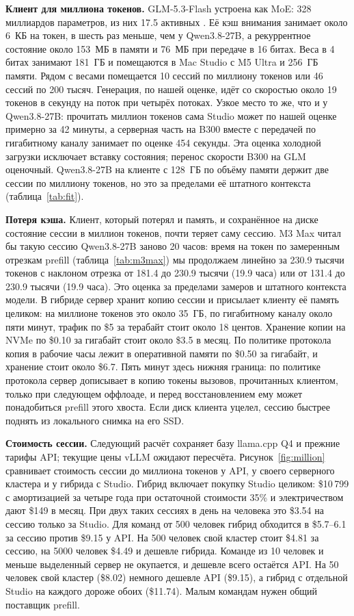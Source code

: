 \textbf{Клиент для миллиона токенов.} GLM-5.3-Flash устроена как MoE: 328 миллиардов параметров, из них 17.5 активных
\cite{glm53flash}. Её кэш внимания занимает около 6~КБ на токен, в шесть раз меньше, чем у Qwen3.8-27B, а рекуррентное состояние около 153~МБ в памяти и 76~МБ при передаче в 16 битах. Веса в 4 битах занимают 181~ГБ и помещаются в Mac Studio с M5 Ultra и 256~ГБ памяти. Рядом с весами
помещается 10 сессий по миллиону токенов или 46 сессий по 200 тысяч. Генерация, по нашей оценке, идёт со скоростью
около 19 токенов в секунду на поток при четырёх потоках. Узкое место то же, что и у Qwen3.8-27B: прочитать миллион токенов сама Studio может по нашей оценке примерно за 42 минуты, а серверная часть на B300 вместе с передачей по гигабитному каналу занимает по оценке 454 секунды.
Эта оценка холодной загрузки исключает вставку состояния; перенос скорости B300 на GLM оценочный. Qwen3.8-27B
на клиенте с 128~ГБ по объёму памяти держит две сессии по миллиону токенов, но это за пределами её штатного
контекста (таблица~\ref{tab:fit}).

\textbf{Потеря кэша.} Клиент, который потерял и память, и сохранённое на диске состояние сессии в миллион токенов,
почти теряет саму сессию. M3 Max читал бы такую сессию Qwen3.8-27B заново 20 часов: время на токен по замеренным
отрезкам prefill (таблица~\ref{tab:m3max}) мы продолжаем линейно за 230.9 тысячи токенов с наклоном отрезка от 181.4 до 230.9 тысячи (19.9 часа) или от 131.4 до 230.9 тысячи (19.9 часа). Это оценка за пределами замеров и штатного контекста
модели. В гибриде сервер хранит копию сессии и присылает клиенту её память целиком: на миллионе токенов это около 35~ГБ, по гигабитному каналу около пяти минут, трафик по \$5 за терабайт стоит около 18 центов. Хранение копии на NVMe по \$0.10 за гигабайт стоит около \$3.5 в месяц. По политике протокола копия в рабочие часы лежит в оперативной памяти по \$0.50 за гигабайт, и хранение стоит около \$6.7. Пять минут здесь нижняя граница: по политике протокола
сервер дописывает в копию токены вызовов, прочитанных клиентом, только при следующем оффлоаде, и перед
восстановлением ему может понадобиться prefill этого хвоста. Если диск клиента уцелел, сессию быстрее поднять из
локального снимка на его SSD.

\textbf{Стоимость сессии.} Следующий расчёт сохраняет базу llama.cpp Q4 и прежние тарифы API; текущие цены vLLM ожидают пересчёта. Рисунок~\ref{fig:million} сравнивает стоимость сессии до миллиона токенов у API, у своего
серверного кластера и у гибрида с Studio. Гибрид включает покупку Studio целиком: \$10\,799 с амортизацией за четыре
года при остаточной стоимости 35\% и электричеством дают \$149 в месяц. При двух таких сессиях в день на человека это \$3.54 на сессию только за Studio. Для команд от
500 человек гибрид обходится в \$5.7--6.1 за сессию против \$9.15 у API.
На 500 человек свой кластер стоит \$4.81 за сессию, на 5000 человек \$4.49 и дешевле гибрида.
Команде из 10 человек и меньше выделенный сервер не окупается, и дешевле всего остаётся API. На 50 человек свой кластер
(\$8.02) немного дешевле API (\$9.15), а гибрид с отдельной Studio на каждого дороже обоих (\$11.74). Малым командам нужен общий
поставщик prefill.

